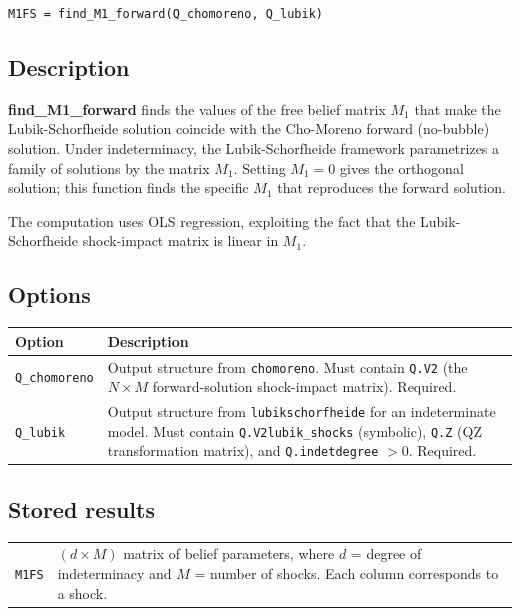 \documentclass{article}
\begin{document}
\begin{verbatim}
M1FS = find_M1_forward(Q_chomoreno, Q_lubik)
\end{verbatim}

\subsection{Description}

\textbf{find\_M1\_forward} finds the values of the free belief matrix $M_1$ that make the Lubik-Schorfheide solution coincide with the Cho-Moreno forward (no-bubble) solution. Under indeterminacy, the Lubik-Schorfheide framework parametrizes a family of solutions by the matrix $M_1$. Setting $M_1 = 0$ gives the orthogonal solution; this function finds the specific $M_1$ that reproduces the forward solution.

The computation uses OLS regression, exploiting the fact that the Lubik-Schorfheide shock-impact matrix is linear in $M_1$.

\subsection{Options}

\begin{longtable}[c]{p{3.2cm}p{10.8cm}}
\toprule
\textbf{Option} & \textbf{Description} \\
\midrule
\texttt{Q\_chomoreno} & Output structure from \texttt{chomoreno}. Must contain \texttt{Q.V2} (the $N \times M$ forward-solution shock-impact matrix). Required. \\[0.3em]
\texttt{Q\_lubik} & Output structure from \texttt{lubikschorfheide} for an indeterminate model. Must contain \texttt{Q.V2lubik\_shocks} (symbolic), \texttt{Q.Z} (QZ transformation matrix), and \texttt{Q.indetdegree} $> 0$. Required. \\[0.3em]
\bottomrule
\end{longtable}

\subsection{Stored results}

\begin{tabular}{@{}p{4.5cm}p{10cm}@{}}
\texttt{M1FS} & $(d \times M)$ matrix of belief parameters, where $d$ = degree of indeterminacy and $M$ = number of shocks. Each column corresponds to a shock. \\[0.2em]
\end{tabular}
\end{document}
